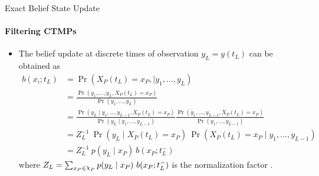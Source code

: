 \documentclass[
	english,%
	aspectratio=169,%
	color={accentcolor=3b},
	logo=true,%
	colorframetitle=false,%
	]{tudabeamer}
\DeclareRobustCommand{\rchi}{{\mathpalette\irchi\relax}}
\newcommand{\irchi}[2]{\raisebox{\depth}{$#1\chi$}}
\begin{document}
\begin{frame}{Exact Belief State Update}
\framesubtitle{Filtering CTMPs}
\begin{itemize}
	\item The belief update at discrete times of observation $ y_{L} = y(t_L) $ can be obtained as
	\begin{align}
	b(x_{i}; t_{L}) & = \operatorname{Pr}( X_P(t_{L}) = x_{P},\mid y_{1}, ..., y_{L}) \nonumber\\ & = \frac{\operatorname{Pr}(y_{1}, ..., y_{L}, X_P(t_{L}) = x_{P})}{\operatorname{Pr}(y_{1}, ..., y_{L})}  \nonumber\\ & = \frac{\operatorname{Pr}(y_{L} \mid y_{1}, ..., y_{L-1}, X_P(t_{L}) = x_{P})}{\operatorname{Pr}(y_{L} \mid y_{1}, ..., y_{L-1})} \frac{\operatorname{Pr}(y_{1}, ..., y_{L-1}, X_P(t_{L}) = x_{P})}{\operatorname{Pr}(y_{1}, ..., y_{L-1})}  \nonumber\\ & = Z_{L}^{-1} \ \operatorname{Pr}(y_{L} \mid X_P(t_{L})=x_{P})\ \operatorname{Pr}( X_P(t_{L}) = x_{P}\mid y_{1}, ..., y_{L-1})  \nonumber\\ & = Z_{L}^{-1}\ {p(y_{L} \mid x_{P})}\ {b(x_{P}; t_{L}^{-})}
	\label{eq:b_jump}
	\end{align}
	where $ Z_{L} = \sum_{x_{P}\in \rchi_P} p(y_{L} \mid x_{P})\ b(x_{P}; t_{L}^{-}) $ is the normalization factor \cite{huang_pauleve_zechner_unger_hansen_koeppl_2016}.
\end{itemize}
\end{frame}
\end{document}
